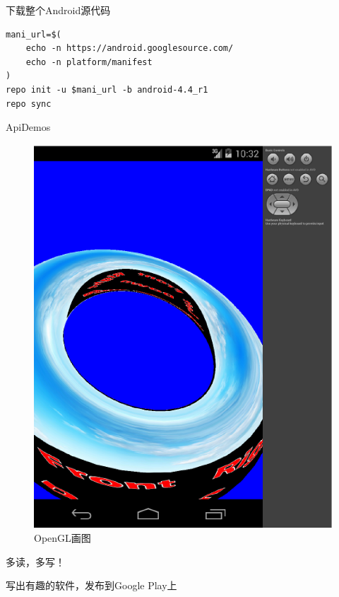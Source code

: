 \documentclass[presentation,dvipdfmx,CJKbookmarks]{beamer}
\begin{document}
\begin{CJK*}{UTF8}{simsun}
\begin{frame}[fragile,label={sec:org1da964e}]{下载整个\thinspace Android\thinspace 源代码}
\begin{verbatim}
mani_url=$(
    echo -n https://android.googlesource.com/
    echo -n platform/manifest
)
repo init -u $mani_url -b android-4.4_r1
repo sync
\end{verbatim}
\end{frame}
\begin{frame}[label={sec:org274a1a5}]{ApiDemos}
\begin{figure}[htbp]
\centering
\includegraphics[width=.5\linewidth]{./images/opengl.ps}
\caption{\label{fig:orgc6e58d7}
OpenGL\thinspace 画图}
\end{figure}
\end{frame}

\begin{frame}[label={sec:org2d3c4b9}]{多读，多写！}
\begin{block}{写出有趣的软件，发布到\thinspace Google Play\thinspace 上}
\end{block}
\end{frame}
\end{CJK*}
\end{document}
